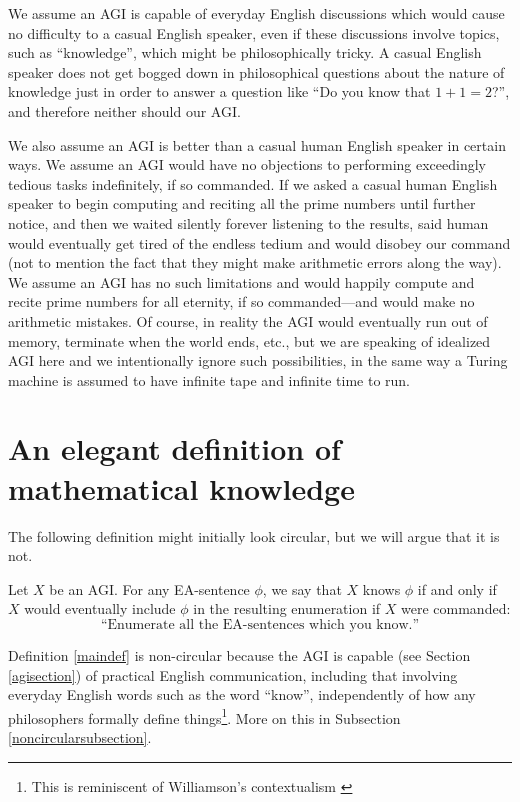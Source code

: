 \documentclass[runningheads]{llncs}
\begin{document}
We assume an AGI is capable of everyday English discussions
which would cause no difficulty to a casual English speaker, even if
these discussions involve topics, such as ``knowledge'', which
might be philosophically tricky. A casual English speaker does not get
bogged down in philosophical questions about the nature of knowledge
just in order to answer a question like ``Do you know that $1+1=2$?'',
and therefore neither should our AGI.

We also assume an AGI is better than a casual human English speaker in certain ways.
We assume an AGI would have no objections to performing exceedingly tedious
tasks indefinitely, if so commanded. If we asked a casual human English speaker to
begin computing and reciting all the prime numbers until further notice, and
then we waited silently forever listening to the results, said human would eventually
get tired of the endless tedium and would disobey our command (not to mention
the fact that they might make arithmetic errors along the way). We assume an AGI
has no such limitations and would happily compute and recite prime numbers for
all eternity, if so commanded---and would make no arithmetic mistakes. Of course,
in reality the AGI would eventually run out of memory, terminate when the world ends,
etc., but we are speaking of idealized AGI here and we
intentionally ignore such possibilities, in the same way a Turing machine is
assumed to have infinite tape and infinite time to run.


\section{An elegant definition of mathematical knowledge}
\label{mainsection}

The following definition might initially look circular, but we will argue that
it is not.

\begin{definition}
\label{maindef}
  Let $X$ be an AGI.
  For any EA-sentence $\phi$, we say that $X$
  knows $\phi$ if and only
  if $X$ would eventually include $\phi$ in the resulting enumeration
  if $X$ were commanded:
  \[
  \text{``Enumerate all the EA-sentences which you know.''}
  \]
\end{definition}

Definition \ref{maindef} is non-circular because
the AGI is capable (see Section \ref{agisection}) of practical English
communication, including that involving everyday English words such as
the word ``know'', independently of how any philosophers formally
define things\footnote{This is reminiscent of
Williamson's contextualism \cite{williamson2005knowledge}}.
More on this in Subsection \ref{noncircularsubsection}.
\end{document}
